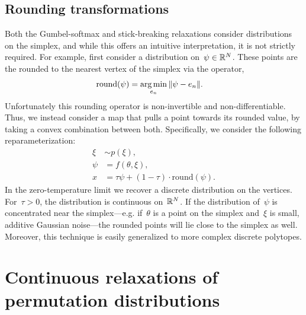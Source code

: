 \subsection{Rounding transformations}
Both the Gumbel-softmax and stick-breaking relaxations consider
distributions on the simplex, and while this
offers an intuitive interpretation, it is not strictly required.  For
example, first consider a distribution on~$\psi \in \mathbb{R}^N$. These
points are the rounded to the nearest vertex of the simplex via the
operator,
\begin{align}
  \mathrm{round}(\psi) &= \argmin_{e_n} \| \psi - e_n \|.
\end{align}
Unfortunately this rounding operator is non-invertible and
non-differentiable.  Thus, we instead consider a map that pulls a
point towards its rounded value, by taking a convex combination
between both. Specifically, we consider the following reparameterization:
\begin{align}
  \xi &\sim p(\xi), \\
  \psi &= f(\theta, \xi), \\
  x &=  \tau \psi + (1-\tau) \cdot \mathrm{round}(\psi) .
\end{align}
In the zero-temperature limit we recover a discrete distribution on
the vertices. For~$\tau > 0$, the distribution is continuous
on~$\mathbb{R}^N$. If the distribution of~$\psi$ is concentrated
near the simplex---e.g. if~$\theta$ is a point on the simplex
and~$\xi$ is small, additive Gaussian noise---the rounded points
will lie close to the simplex as well. Moreover, this technique
is easily generalized to more complex discrete polytopes. 
 
\section{Continuous relaxations of permutation distributions}
\label{sec:permutation}

